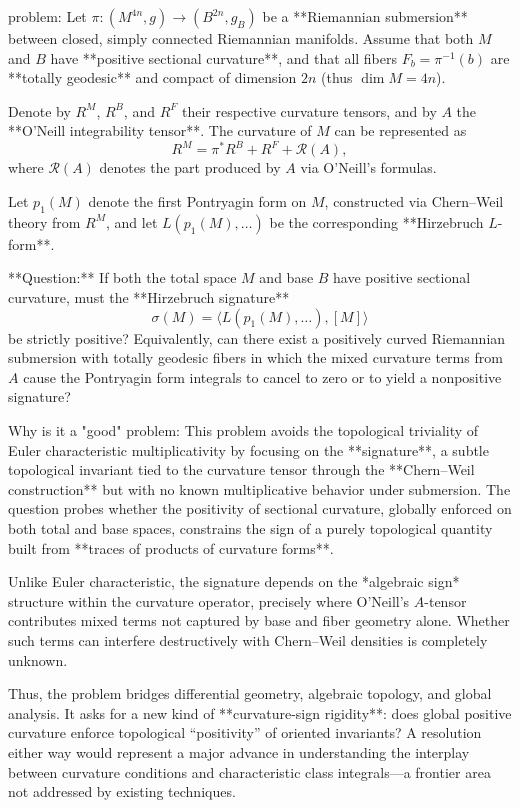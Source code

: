 problem:  
Let \( \pi : (M^{4n}, g) \to (B^{2n}, g_B) \) be a **Riemannian submersion** between closed, simply connected Riemannian manifolds.  
Assume that both \(M\) and \(B\) have **positive sectional curvature**, and that all fibers \(F_b = \pi^{-1}(b)\) are **totally geodesic** and compact of dimension \(2n\) (thus \( \dim M = 4n\)).  

Denote by \(R^M\), \(R^B\), and \(R^F\) their respective curvature tensors, and by \(A\) the **O’Neill integrability tensor**. The curvature of \(M\) can be represented as
\[
R^M = \pi^*R^B + R^F + \mathcal{R}(A),
\]
where \(\mathcal{R}(A)\) denotes the part produced by \(A\) via O’Neill’s formulas.

Let \(p_1(M)\) denote the first Pontryagin form on \(M\), constructed via Chern–Weil theory from \(R^M\), and let \(L(p_1(M), \ldots)\) be the corresponding **Hirzebruch \(L\)-form**.

**Question:**  
If both the total space \(M\) and base \(B\) have positive sectional curvature, must the **Hirzebruch signature**
\[
\sigma(M) = \langle L(p_1(M), \ldots), [M]\rangle
\]
be strictly positive?  
Equivalently, can there exist a positively curved Riemannian submersion with totally geodesic fibers in which the mixed curvature terms from \(A\) cause the Pontryagin form integrals to cancel to zero or to yield a nonpositive signature?

Why is it a "good" problem:  
This problem avoids the topological triviality of Euler characteristic multiplicativity by focusing on the **signature**, a subtle topological invariant tied to the curvature tensor through the **Chern–Weil construction** but with no known multiplicative behavior under submersion. The question probes whether the positivity of sectional curvature, globally enforced on both total and base spaces, constrains the sign of a purely topological quantity built from **traces of products of curvature forms**.  

Unlike Euler characteristic, the signature depends on the *algebraic sign* structure within the curvature operator, precisely where O’Neill’s \(A\)-tensor contributes mixed terms not captured by base and fiber geometry alone. Whether such terms can interfere destructively with Chern–Weil densities is completely unknown.  

Thus, the problem bridges differential geometry, algebraic topology, and global analysis. It asks for a new kind of **curvature-sign rigidity**: does global positive curvature enforce topological “positivity” of oriented invariants? A resolution either way would represent a major advance in understanding the interplay between curvature conditions and characteristic class integrals—a frontier area not addressed by existing techniques.